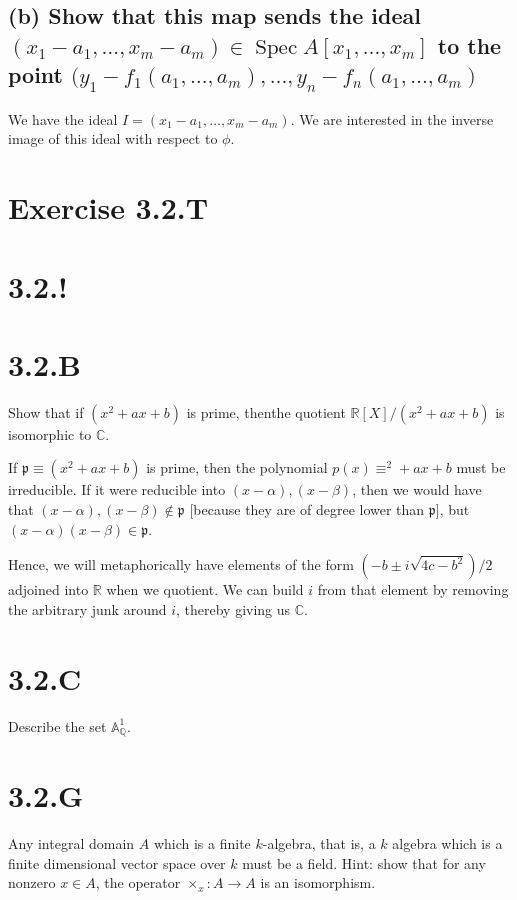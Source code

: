 \documentclass{book}
\newcommand{\Q}{\ensuremath{\mathbb{Q}}}
\newcommand{\C}{\ensuremath{\mathbb{C}}}
\newcommand{\R}{\ensuremath{\mathbb{R}}}
\newcommand{\A}{\ensuremath{\mathbb{A}}}
\newcommand{\Spec}{\operatorname{Spec}}
\newcommand{\p}{\mathfrak{p}}
\theoremstyle{definition}
\begin{document}
\subsection{(b) Show that this map sends the ideal $(x_1 - a_1, \dots, x_m - a_m) \in \Spec A[x_1, \dots, x_m]$
  to the point $(y_1 - f_1(a_1, \dots, a_m), \dots, y_n - f_n(a_1, \dots, a_m)$}

We have the ideal $I = (x_1 - a_1, \dots, x_m - a_m)$. We are interested
in the inverse image of this ideal with respect to $\phi$.

\section{Exercise 3.2.T}

\section{3.2.!}
\section{3.2.B}
Show that if $(x^2 + ax + b)$ is prime, thenthe quotient $\R[X]/(x^2 + ax + b)$ 
is isomorphic to $\C$.

If $\p \equiv (x^2 + ax + b)$ is prime, then the polynomial $p(x) \equiv ^2 + ax + b$ must be irreducible.
If it were reducible into
$(x - \alpha), (x - \beta)$, then we would have that $(x - \alpha), (x - \beta) \not \in \p$
[because they are of degree lower than $\p$], but $(x - \alpha)(x - \beta) \in \p$.

Hence, we will metaphorically have elements of the form $(-b \pm i\sqrt{4c - b^2})/2$
adjoined into $\R$ when we quotient. We can build $i$ from that element
by removing the arbitrary junk around $i$, thereby giving us $\C$.

\section{3.2.C}
Describe the set $\A^1_\Q$.

\section{3.2.G}
Any integral domain $A$ which is a finite $k$-algebra, that is, a $k$ algebra
which is a finite dimensional vector space over $k$ must be a field.
Hint: show that for any nonzero $x \in A$, the operator $\times_x : A \rightarrow A$
is an isomorphism.
\end{document}
